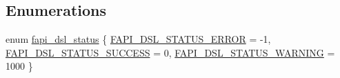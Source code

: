 \subsection*{Enumerations}
\begin{DoxyCompactItemize}
\item 
enum \hyperlink{group__FAPI__DSL_ga6a68d961535e6f7aa239751763131a70}{fapi\-\_\-dsl\-\_\-status} \{ \hyperlink{group__FAPI__DSL_gga6a68d961535e6f7aa239751763131a70a86b665546ec20b43571b0d828acf309b}{F\-A\-P\-I\-\_\-\-D\-S\-L\-\_\-\-S\-T\-A\-T\-U\-S\-\_\-\-E\-R\-R\-O\-R} = -\/1, 
\hyperlink{group__FAPI__DSL_gga6a68d961535e6f7aa239751763131a70a7eb73193aa8bbe9c3dac32625afa7930}{F\-A\-P\-I\-\_\-\-D\-S\-L\-\_\-\-S\-T\-A\-T\-U\-S\-\_\-\-S\-U\-C\-C\-E\-S\-S} = 0, 
\hyperlink{group__FAPI__DSL_gga6a68d961535e6f7aa239751763131a70a970d91f80d2a68ab271d778404fb4542}{F\-A\-P\-I\-\_\-\-D\-S\-L\-\_\-\-S\-T\-A\-T\-U\-S\-\_\-\-W\-A\-R\-N\-I\-N\-G} = 1000
 \}
\end{DoxyCompactItemize}
